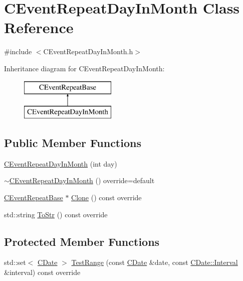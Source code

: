 \hypertarget{class_c_event_repeat_day_in_month}{}\section{C\+Event\+Repeat\+Day\+In\+Month Class Reference}
\label{class_c_event_repeat_day_in_month}


{\ttfamily \#include $<$C\+Event\+Repeat\+Day\+In\+Month.\+h$>$}

Inheritance diagram for C\+Event\+Repeat\+Day\+In\+Month\+:\begin{figure}[H]
\begin{center}
\leavevmode
\includegraphics[height=2.000000cm]{class_c_event_repeat_day_in_month}
\end{center}
\end{figure}
\subsection*{Public Member Functions}
\begin{DoxyCompactItemize}
\item 
\mbox{\hyperlink{class_c_event_repeat_day_in_month_a161460e3eeb9fa2a027d39004828a760}{C\+Event\+Repeat\+Day\+In\+Month}} (int day)
\item 
\mbox{\hyperlink{class_c_event_repeat_day_in_month_a37483901cea40744356c63cc491f759a}{$\sim$\+C\+Event\+Repeat\+Day\+In\+Month}} () override=default
\item 
\mbox{\hyperlink{class_c_event_repeat_base}{C\+Event\+Repeat\+Base}} $\ast$ \mbox{\hyperlink{class_c_event_repeat_day_in_month_a329373945107435d629ecc2491ce8b38}{Clone}} () const override
\item 
std\+::string \mbox{\hyperlink{class_c_event_repeat_day_in_month_a5ec4554d0d7c1c9a50cd1f37f0d76673}{To\+Str}} () const override
\end{DoxyCompactItemize}
\subsection*{Protected Member Functions}
\begin{DoxyCompactItemize}
\item 
std\+::set$<$ \mbox{\hyperlink{class_c_date}{C\+Date}} $>$ \mbox{\hyperlink{class_c_event_repeat_day_in_month_a84de2696efb387af591bff04f37fd7ed}{Test\+Range}} (const \mbox{\hyperlink{class_c_date}{C\+Date}} \&date, const \mbox{\hyperlink{class_c_date_af23472c977b14ed341b48183ec19d874}{C\+Date\+::\+Interval}} \&interval) const override
\end{DoxyCompactItemize}
